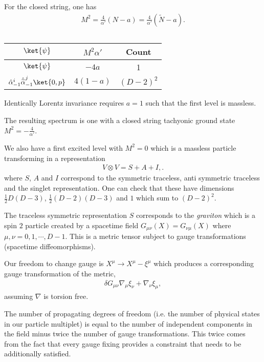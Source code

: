  For the closed string, one has
 \begin{align}
     M^2 = \frac{4}{\alpha'} \left( N - a \right) = \frac{4}{\alpha'} \left( \widetilde{N} - a \right) 
 .\end{align}

 \begin{table}[h]
     \centering
     \caption{}
     \label{tab:css}
     \begin{tabular}{ccc}
      $\ket{\psi}$& $M^2 \alpha'$  & Count \\ 
      \midrule
      $\ket{\psi}$ & $-4a$ & 1 \\
      $\hat{\alpha}^{i}_{-1} \hat{\widetilde{\alpha}}_{-1}^{j} \ket{0, p}$ & $4 \left( 1 - a \right) $ & $\left(  D - 2 \right)^2$ \\
     \end{tabular}
 \end{table}

 Identically Lorentz invariance requires $a = 1$ such that the first level is massless.

 The resulting spectrum is one with a closed string tachyonic ground state $M^2 = -\frac{4}{\alpha'}$.

 We also have a first excited level with $M^2 = 0$ which is a massless particle transforming in a representation
 \begin{align}
     V \otimes V = S + A + I
,.\end{align}
where $S$, $A$ and $I$ correspond to the symmetric traceless, anti symmetric traceless and the singlet representation. One can check that these have dimensions $\frac{1}{2} D \left( D - 3 \right) $, $\frac{1}{2} \left( D - 2 \right) \left( D - 3 \right) $ and $1$ which sum to $\left( D - 2 \right)^2$.

The traceless symmetric representation $S$ corresponds to the \emph{graviton} which is a spin $2$ particle created by a spacetime field $G_{\mu \nu} \left( X \right) = G_{\nu \mu}\left( X \right) $ where $\mu, \nu = 0,1,\cdots , D - 1$. This is a metric tensor subject to gauge transformations (spacetime diffeomorphisms). 

Our freedom to change gauge is $X^{\mu} \to X^{\mu} - \xi^{\mu}$ which produces a corresponding gauge transformation of the metric,
\begin{align}
    \delta G_{\mu \nu} \nabla_\mu \xi_\nu + \nabla_\nu \xi_\mu
,\end{align}
assuming $\nabla$ is torsion free.

The number of propagating degrees of freedom (i.e. the number of physical states in our particle multiplet) is equal to the number of independent components in the field minus twice the number of gauge transformations. This twice comes from the fact that every gauge fixing provides a constraint that needs to be additionally satisfied.

